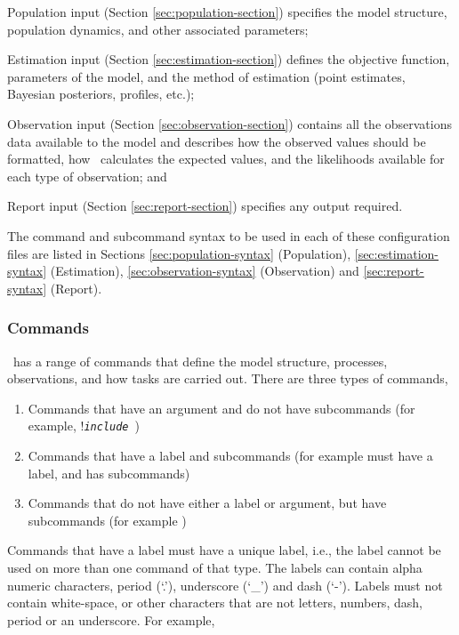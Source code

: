 \begin{description}

\item Population input (Section \ref{sec:population-section}) specifies the model structure, population dynamics, and other associated parameters;
\item Estimation input (Section \ref{sec:estimation-section}) defines the objective function, parameters of the model, and the method of estimation (point estimates, Bayesian posteriors, profiles, etc.);
\item Observation input (Section \ref{sec:observation-section}) contains all the observations data available to the model and  describes how the observed values should be formatted, how \CNAME\ calculates the expected values, and the likelihoods available for each type of observation; and
\item Report input (Section \ref{sec:report-section}) specifies any output required.
\end{description}

The command and subcommand syntax to be used in each of these configuration files are listed in Sections \ref{sec:population-syntax} (Population), \ref{sec:estimation-syntax} (Estimation), \ref{sec:observation-syntax} (Observation) and \ref{sec:report-syntax} (Report).

\subsubsection{Commands}

\CNAME\ has a range of commands that define the model structure, processes, observations, and how tasks are carried out. There are three types of commands, 

\begin{enumerate}
\item Commands that have an argument and do not have subcommands (for example, !\texttt{\emph{include}}\ )
\item Commands that have a label and subcommands (for example  must have a label, and has subcommands)
\item Commands that do not have either a label or argument, but have subcommands (for example )
\end{enumerate}

Commands that have a label must have a unique label, i.e., the label cannot be used on more than one command of that type. The labels can contain alpha numeric characters, period (`.'), underscore (`\_') and dash (`-'). Labels must not contain white-space, or other characters that are not letters, numbers, dash, period or an underscore. For example,

